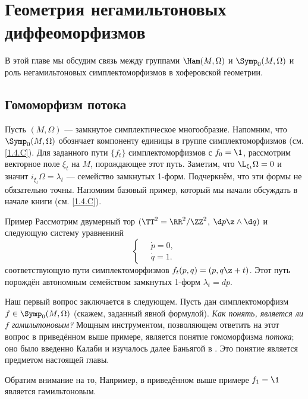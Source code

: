 \chapter[Негамильтоновы диффеоморфизмы]{Геометрия негамильтоновых
  диффеоморфизмов}\label{chap:14}


В этой главе мы обсудим связь между группами $\Ham(M,\Omega)$ и
$\Symp_0(M,\Omega)$ и роль негамильтоновых симплектоморфизмов в
хоферовской геометрии. 

\section{Гомоморфизм потока}\label{sec:14.1}

Пусть $(M,\Omega)$ — замкнутое симплектическое многообразие.
Напомним, что $\Symp_0(M,\Omega)$ обознчает компоненту единицы в
группе симплектоморфизмов (см. \ref{1.4.C}).
Для заданного пути $\{f_t\}$ симплектоморфизмов с $f_0 = \1$,
рассмотрим векторное поле $\xi_t$ на $M$, порождающее этот путь.
Заметим, что $\L_{\xi_t}\Omega=0$ и значит
$i_{\xi_t}\Omega=\lambda_t$ — семейство замкнутых 1-форм.
Подчеркнём, что эти формы не обязательно точны.
Напомним базовый пример, который мы начали обсуждать в начале книги
(см. \ref{1.4.C}). 


\begin{thm}{Пример}\label{14.1.A}
Рассмотрим двумерный тор $(\TT^2=\RR^2/\ZZ^2$, $\d p\z\wedge \d q)$ и
следующую систему уравненинй 
\[
\begin{cases}
\quad\dot p=0,
\\
\quad\dot q=1.
\end{cases}
\]
соответствующую пути симплектоморфизмов $f_t(p, q) = (p, q \z+ t)$.
Этот путь порождён автономным семейством замкнутых 1-форм $\lambda_t = dp$.
\end{thm}


Наш первый вопрос заключается в следующем.  Пусть дан симплектоморфизм
$f\in\Symp_0(M,\Omega)$ (скажем, заданный явной формулой).
\textit{Как понять, является ли $f$ гамильтоновым?}  Мощным
инструментом, позволяющем ответить на этот вопрос в приведённом выше
примере, является понятие гомоморфизма \emph{потока}; оно было
введенно Калаби и изучалось далее
Баньягой в \cite{B1}.  Это понятие является предметом
настоящей главы.

Обратим внимание на то,
Например, в приведённом выше примере $f_1 = \1$ является гамильтоновым.

